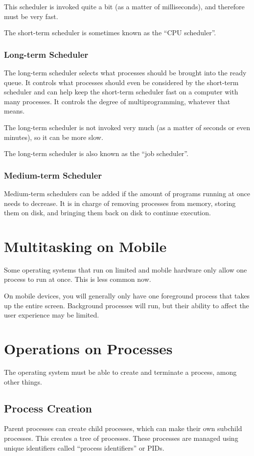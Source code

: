 \documentclass{article}
\begin{document}
This scheduler is invoked quite a bit (as a matter of milliseconds), and
therefore must be very fast.

The short-term scheduler is sometimes known as the ``CPU scheduler''.

\subsubsection{Long-term Scheduler}
The long-term scheduler selects what processes should be brought into the ready
queue. It controls what processes should even be considered by the short-term
scheduler and can help keep the short-term scheduler fast on a computer with
many processes. It controls the degree of multiprogramming, whatever that
means.

The long-term scheduler is not invoked very much (as a matter of seconds or
even minutes), so it can be more slow.

The long-term scheduler is also known as the ``job scheduler''.

\subsubsection{Medium-term Scheduler}
Medium-term schedulers can be added if the amount of programs running at once
needs to decrease. It is in charge of removing processes from memory, storing
them on disk, and bringing them back on disk to continue execution.

\section{Multitasking on Mobile}
Some operating systems that run on limited and mobile hardware only allow one
process to run at once. This is less common now.

On mobile devices, you will generally only have one foreground process that
takes up the entire screen. Background processes will run, but their ability to
affect the user experience may be limited.

\section{Operations on Processes}
The operating system must be able to create and terminate a process, among
other things.

\subsection{Process Creation}
Parent processes can create child processes, which can make their own subchild
processes. This creates a tree of processes. These processes are managed using
unique identifiers called ``process identifiers'' or PIDs.
\end{document}
